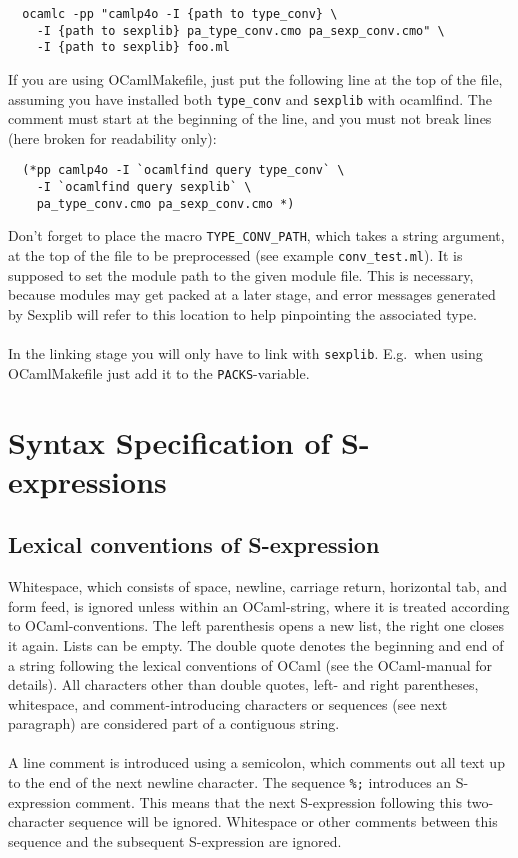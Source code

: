 \documentclass[a4paper]{article}
\begin{document}
\begin{verbatim}
  ocamlc -pp "camlp4o -I {path to type_conv} \
    -I {path to sexplib} pa_type_conv.cmo pa_sexp_conv.cmo" \
    -I {path to sexplib} foo.ml
\end{verbatim}

If you are using OCamlMakefile, just put the following line at the
top of the file, assuming you have installed both \verb=type_conv= and
\verb=sexplib= with ocamlfind.  The comment must start at the beginning of
the line, and you must not break lines (here broken for readability only):

\begin{verbatim}
  (*pp camlp4o -I `ocamlfind query type_conv` \
    -I `ocamlfind query sexplib` \
    pa_type_conv.cmo pa_sexp_conv.cmo *)
\end{verbatim}

Don't forget to place the macro \verb=TYPE_CONV_PATH=, which takes a
string argument, at the top of the file to be preprocessed (see example
\verb=conv_test.ml=).  It is supposed to set the module path to the given
module file.  This is necessary, because modules may get packed at a later
stage, and error messages generated by Sexplib will refer to this location
to help pinpointing the associated type.\\
\\
In the linking stage you will only have to link with \verb=sexplib=.
E.g.\ when using OCamlMakefile just add it to the \verb=PACKS=-variable.

\section{Syntax Specification of S-expressions}

\subsection{Lexical conventions of S-expression}

Whitespace, which consists of space, newline, carriage return, horizontal tab,
and form feed, is ignored unless within an OCaml-string, where it is treated
according to OCaml-conventions.  The left parenthesis opens a new list, the
right one closes it again.  Lists can be empty.  The double quote denotes
the beginning and end of a string following the lexical conventions of OCaml
(see the OCaml-manual for details).  All characters other than double quotes,
left- and right parentheses, whitespace, and comment-introducing characters
or sequences (see next paragraph) are considered part of a contiguous string.\\
\\
A line comment is introduced using a semicolon, which comments out all
text up to the end of the next newline character.  The sequence \verb=%;=
introduces an S-expression comment.  This means that the next S-expression
following this two-character sequence will be ignored.  Whitespace or other
comments between this sequence and the subsequent S-expression are ignored.
\end{document}
